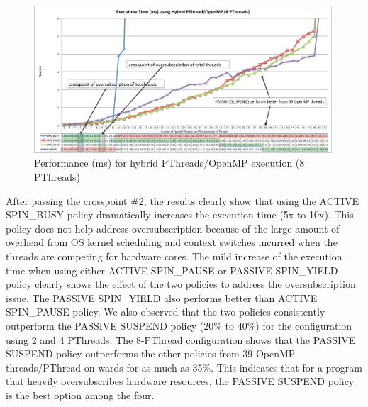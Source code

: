\begin{figure}[h]
    \includegraphics[width=0.99\textwidth] {images/8PThread_performance}
    \caption{Performance (ms) for hybrid PThreads/OpenMP execution (8 PThreads)}
    \label{fig:8PThread_performance}
\end{figure}


After passing the crosspoint \#2, the results clearly show that using the {\sf ACTIVE SPIN\_BUSY} 
policy dramatically increases the execution time (5x to 10x).
This policy does not help address oversubscription because of the large amount of overhead from OS kernel scheduling and context switches 
incurred when the threads are competing for hardware cores. The mild increase
of the execution time when using either {\sf ACTIVE SPIN\_PAUSE} or {\sf PASSIVE SPIN\_YIELD} 
policy clearly shows the effect of the two policies to address
the oversubscription issue. The {\sf PASSIVE SPIN\_YIELD} also performs better than {\sf ACTIVE SPIN\_PAUSE} policy. 
We also observed that the two policies consistently outperform the {\sf PASSIVE SUSPEND}
policy (20\% to 40\%) for the configuration using 2 and 4 PThreads. The 8-PThread configuration shows that the 
 {\sf PASSIVE SUSPEND} policy outperforms the other policies from 39 OpenMP threads/PThread on wards for as much as 35\%. 
 This indicates that for a program that heavily oversubscribes hardware resources, the {\sf PASSIVE SUSPEND} 
 policy is the best option among the four.

